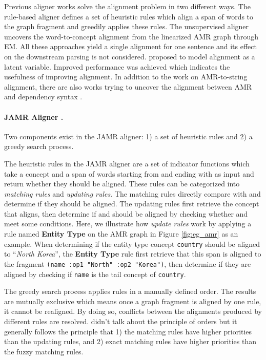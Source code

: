 \documentclass[11pt,a4paper]{article}
\begin{document}
Previous aligner works solve the alignment problem
in two different ways.
The rule-based aligner \cite{flanigan-EtAl:2014:P14-1}
defines a set of heuristic rules which align a span of
words to the graph fragment and greedily applies
these rules.
The unsupervised aligner
\cite{pourdamghani-EtAl:2014:EMNLP2014,wang-xue:2017:EMNLP2017}
uncovers the word-to-concept alignment from
the linearized AMR graph through EM.
All these approaches yield a single alignment for one sentence
and its effect on the downstream parsing is not considered.
\citet{P18-1037} proposed to
model alignment as a latent variable.
Improved performance was achieved
which indicates the usefulness of improving alignment.
In addition to the work on AMR-to-string alignment,
there are also works trying to uncover the 
alignment between AMR  and dependency syntax \citep{szubert-lopez-schneider:2018:N18-1}.

\paragraph{JAMR Aligner \cite{flanigan-EtAl:2014:P14-1}.}
Two components exist in the JAMR aligner:
1) a set of heuristic rules and 2) a greedy search process.

The heuristic rules in the JAMR aligner
are a set of indicator functions 
which take a concept  and a span of words  starting from  and ending with 
as input and return whether
they should be aligned.
These rules  can be categorized into {\it matching rules} and {\it updating rules}.
The matching rules directly compare  with  and determine if they should be aligned.
The updating rules first retrieve the concept  that  aligns,
then determine if  and  should be aligned by checking whether
 and  meet some conditions.
Here, we illustrate how \textit{update rules} work by applying a rule named \textbf{Entity Type}
on the AMR graph in Figure \ref{fig:eg_amr}
as an example.
When determining if the entity type concept \texttt{country} should be aligned to ``\textit{North Korea}'',
the \textbf{Entity Type} rule first retrieve that this span is aligned to the fragment \texttt{(name :op1 "North" :op2 "Korea")},
then determine if they are aligned by checking if \texttt{name} is the tail concept of \texttt{country}.


The greedy search process applies rules in a manually defined order.
The results are mutually exclusive which means
once a graph fragment is aligned by one rule, it cannot be realigned.
By doing so, conflicts between the alignments produced by 
different rules are resolved.
\citet{flanigan-EtAl:2014:P14-1} didn't talk about the principle of orders
but it generally follows the principle that 1) the matching rules have higher priorities
than the updating rules, 
and 2) exact matching rules have higher priorities than the fuzzy matching rules.
\end{document}
